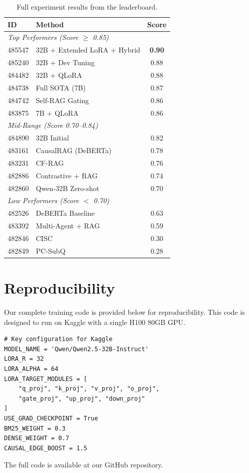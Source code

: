 \documentclass[11pt]{article}
\begin{document}
\begin{table}[h]
\centering
\small
\begin{tabular}{llc}
\toprule
\textbf{ID} & \textbf{Method} & \textbf{Score} \\
\midrule
\multicolumn{3}{l}{\textit{Top Performers (Score $\geq$ 0.85)}} \\
485547 & 32B + Extended LoRA + Hybrid & \textbf{0.90} \\
485240 & 32B + Dev Tuning & 0.88 \\
484482 & 32B + QLoRA & 0.88 \\
484738 & Full SOTA (7B) & 0.87 \\
484742 & Self-RAG Gating & 0.86 \\
483875 & 7B + QLoRA & 0.86 \\
\midrule
\multicolumn{3}{l}{\textit{Mid-Range (Score 0.70--0.84)}} \\
484890 & 32B Initial & 0.82 \\
483161 & CausalRAG (DeBERTa) & 0.78 \\
483231 & CF-RAG & 0.76 \\
482886 & Contrastive + RAG & 0.74 \\
482860 & Qwen-32B Zero-shot & 0.70 \\
\midrule
\multicolumn{3}{l}{\textit{Low Performers (Score $<$ 0.70)}} \\
482526 & DeBERTa Baseline & 0.63 \\
483392 & Multi-Agent + RAG & 0.59 \\
482846 & CISC & 0.30 \\
482849 & PC-SubQ & 0.28 \\
\bottomrule
\end{tabular}
\caption{Full experiment results from the leaderboard.}
\label{tab:full_results}
\end{table}

\section{Reproducibility}
\label{app:code}

Our complete training code is provided below for reproducibility. This code is designed to run on Kaggle with a single H100 80GB GPU.

\begin{verbatim}
# Key configuration for Kaggle
MODEL_NAME = 'Qwen/Qwen2.5-32B-Instruct'
LORA_R = 32
LORA_ALPHA = 64
LORA_TARGET_MODULES = [
    "q_proj", "k_proj", "v_proj", "o_proj",
    "gate_proj", "up_proj", "down_proj"
]
USE_GRAD_CHECKPOINT = True
BM25_WEIGHT = 0.3
DENSE_WEIGHT = 0.7
CAUSAL_EDGE_BOOST = 1.5
\end{verbatim}

The full code is available at our GitHub repository.
\end{document}
